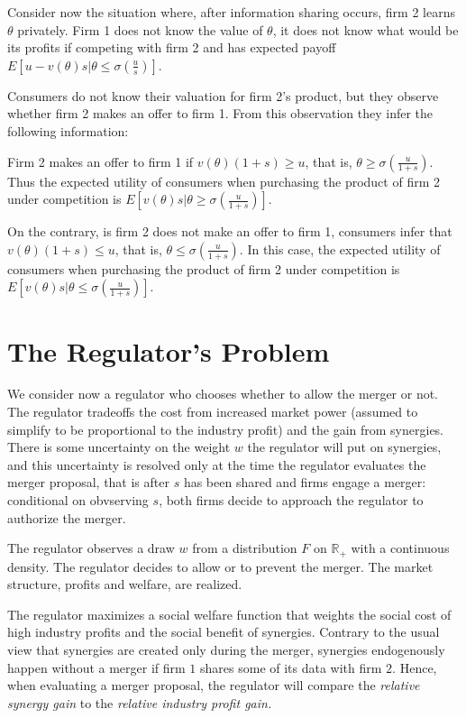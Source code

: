 \documentclass[a4paper,leqno]{article}%
\renewcommand{\t}{\theta}
\newcommand{\s}{\sigma}
\begin{document}
Consider now the situation where, after information sharing occurs, firm 2 learns $\t$ privately. Firm 1 does not know the value of $\t$, it does not know what would be its profits if competing with firm 2 and has expected payoff $E[u-v(\t)s|\t\leq \s(\frac{u}{s})]$.

Consumers do not know their valuation for firm 2's product, but they observe whether firm 2 makes an offer to firm 1. From this observation they infer the following information:


Firm 2 makes an offer to firm 1 if $v(\t)(1+s)\geq u$, that is, $\t\geq \s(\frac{u}{1+s})$. Thus the expected utility of consumers when purchasing the product of firm 2 under competition is $E[v(\t)s|\t\geq \s(\frac{u}{1+s})]$.

On the contrary, is firm 2 does not make an offer to firm 1, consumers infer that $v(\t)(1+s)\leq u$, that is, $\t\leq \s(\frac{u}{1+s})$. In this case, the expected utility of consumers when purchasing the product of firm 2 under competition is $E[v(\t)s|\t\leq \s(\frac{u}{1+s})]$.



\section{The Regulator's Problem}

We consider now a regulator who chooses whether to allow the merger or not. The regulator tradeoffs the cost from increased market power (assumed to simplify to be proportional to the industry profit) and the gain from synergies. There is some uncertainty on the weight $w$ the regulator will put on synergies, and this uncertainty is resolved only at the time the regulator evaluates the merger proposal, that is after $s$ has been shared and firms engage a merger: conditional on obvserving $s$, both firms decide to approach the regulator to authorize the merger.

\medskip

The regulator observes a draw $w$ from a distribution $F$ on $\mathbb R_+$ with a continuous density. The regulator decides to allow or to prevent the merger. The market structure, profits and welfare, are realized.

\medskip

The regulator maximizes a social welfare function that weights the social cost of high industry profits and the social benefit of synergies. Contrary to the usual view that synergies are created only during the merger, synergies endogenously happen without a merger if firm $1$ shares some of its data with firm $2$. Hence, when evaluating a merger proposal, the regulator will compare the \emph{relative synergy gain} to the \emph{relative industry profit gain.}
\end{document}
